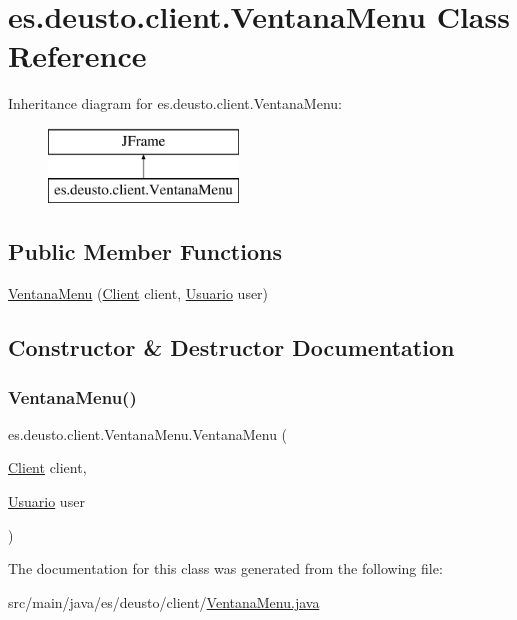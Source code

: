 \hypertarget{classes_1_1deusto_1_1client_1_1_ventana_menu}{}\section{es.\+deusto.\+client.\+Ventana\+Menu Class Reference}
\label{classes_1_1deusto_1_1client_1_1_ventana_menu}
Inheritance diagram for es.\+deusto.\+client.\+Ventana\+Menu\+:\begin{figure}[H]
\begin{center}
\leavevmode
\includegraphics[height=2.000000cm]{classes_1_1deusto_1_1client_1_1_ventana_menu}
\end{center}
\end{figure}
\subsection*{Public Member Functions}
\begin{DoxyCompactItemize}
\item 
\mbox{\hyperlink{classes_1_1deusto_1_1client_1_1_ventana_menu_a7fbd92bbd21b15738ee475e383d54de7}{Ventana\+Menu}} (\mbox{\hyperlink{classes_1_1deusto_1_1client_1_1_client}{Client}} client, \mbox{\hyperlink{classes_1_1deusto_1_1server_1_1jdo_1_1_usuario}{Usuario}} user)
\end{DoxyCompactItemize}


\subsection{Constructor \& Destructor Documentation}
\mbox{\label{classes_1_1deusto_1_1client_1_1_ventana_menu_a7fbd92bbd21b15738ee475e383d54de7}} 
\subsubsection{\texorpdfstring{VentanaMenu()}{VentanaMenu()}}
{\footnotesize\ttfamily es.\+deusto.\+client.\+Ventana\+Menu.\+Ventana\+Menu (\begin{DoxyParamCaption}\item[{\mbox{\hyperlink{classes_1_1deusto_1_1client_1_1_client}{Client}}}]{client,  }\item[{\mbox{\hyperlink{classes_1_1deusto_1_1server_1_1jdo_1_1_usuario}{Usuario}}}]{user }\end{DoxyParamCaption})}



The documentation for this class was generated from the following file\+:\begin{DoxyCompactItemize}
\item 
src/main/java/es/deusto/client/\mbox{\hyperlink{_ventana_menu_8java}{Ventana\+Menu.\+java}}\end{DoxyCompactItemize}
